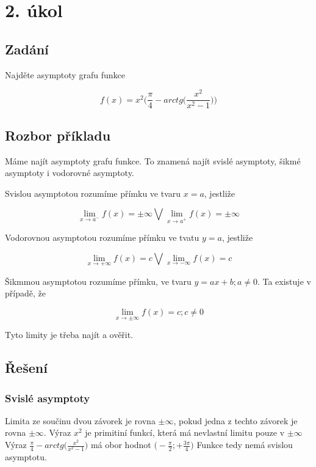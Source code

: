 \section{2. úkol}
\subsection{Zadání}

Najděte asymptoty grafu funkce 

\begin{displaymath}
f(x) = x^2\Big(\frac{\pi}{4}-arctg\Big(\frac{x^2}{x^2-1}\Big)\Big)
\end{displaymath}

\subsection{Rozbor příkladu}

Máme najít asymptoty grafu funkce. To znamená najít svislé asymptoty, šikmé asymptoty i vodorovné asymptoty.

Svislou asymptotou rozumíme přímku ve tvaru $x=a$, jestliže 

\begin{displaymath}
\lim_{x \to a^-} f(x) = \pm \infty \bigvee\lim_{x \to a^+} f(x) = \pm \infty
\end{displaymath}

Vodorovnou asymptotou rozumíme přímku ve tvatu $y=a$, jestliže

\begin{displaymath}
\lim_{x \to +\infty} f(x) = c \bigvee\lim_{x \to - \infty} f(x) = c
\end{displaymath}

Šikmmou asymptotou rozumíme přímku, ve tvaru $y=ax+b;a \neq 0$. Ta existuje v případě, že

\begin{displaymath}
\lim_{x \to \pm \infty} f(x) = c ;c \neq 0
\end{displaymath}

Tyto limity je třeba najít a ověřit.

\subsection{Řešení}

\subsubsection{Svislé asymptoty}
Limita ze součinu dvou závorek je rovna $ \pm \infty$, pokud jedna z techto závorek je rovna $\pm \infty$. Výraz $x^2$ je primitiní funkcí, která má nevlastní limitu pouze v $\pm \infty$ Výraz $\frac{\pi}{4}-arctg\big(\frac{x^2}{x^2-1}\big)$ má obor hodnot $\big(-\frac{\pi}{2};+\frac{3\pi}{4}\big)$ Funkce tedy nemá svislou asymptotu.
